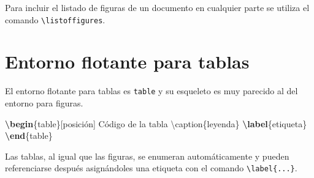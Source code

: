 \documentclass[
  a4paper,
]{scrreport}
\newenvironment{Shaded}{\begin{snugshade}}{\end{snugshade}}
\newcommand{\ExtensionTok}[1]{\textcolor[rgb]{0.00,0.23,0.31}{#1}}
\newcommand{\FunctionTok}[1]{\textcolor[rgb]{0.28,0.35,0.67}{#1}}
\newcommand{\KeywordTok}[1]{\textcolor[rgb]{0.00,0.23,0.31}{\textbf{#1}}}
\newcommand{\NormalTok}[1]{\textcolor[rgb]{0.00,0.23,0.31}{#1}}
\theoremstyle{definition}
\theoremstyle{remark}
\begin{document}
Para incluir el listado de figuras de un documento en cualquier parte se
utiliza el comando \texttt{\textbackslash{}listoffigures}.

\section{Entorno flotante para
tablas}\label{entorno-flotante-para-tablas}

El entorno flotante para tablas es \texttt{table} y su esqueleto es muy
parecido al del entorno para figuras.

\begin{Shaded}
\begin{Highlighting}[]
\KeywordTok{\textbackslash{}begin}\NormalTok{\{}\ExtensionTok{table}\NormalTok{\}[posición]}
\NormalTok{    Código de la tabla}
\FunctionTok{\textbackslash{}caption}\NormalTok{\{leyenda\}}
\KeywordTok{\textbackslash{}label}\NormalTok{\{}\ExtensionTok{etiqueta}\NormalTok{\}}
\KeywordTok{\textbackslash{}end}\NormalTok{\{}\ExtensionTok{table}\NormalTok{\}}
\end{Highlighting}
\end{Shaded}

Las tablas, al igual que las figuras, se enumeran automáticamente y
pueden referenciarse después asignándoles una etiqueta con el comando
\texttt{\textbackslash{}label\{...\}}.
\end{document}

